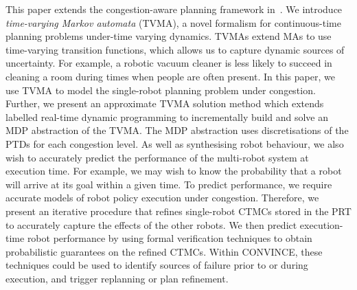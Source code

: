 \documentclass[12pt]{article}
\begin{document}
\begin{enumerate}
This paper extends the congestion-aware planning framework in~\cite{street2020multi}.
%
We introduce \emph{time-varying Markov automata} (TVMA), a novel formalism for continuous-time planning problems under-time varying dynamics.
%
TVMAs extend MAs to use time-varying transition functions, which allows us to capture dynamic sources of uncertainty.
%
For example, a robotic vacuum cleaner is less likely to succeed in cleaning a room during times when people are often present.
%
In this paper, we use TVMA to model the single-robot planning problem under congestion.
% 
Further, we present an approximate TVMA solution method which extends labelled real-time dynamic programming to incrementally build and solve an MDP abstraction of the TVMA.
%
The MDP abstraction uses discretisations of the PTDs for each congestion level.
%
As well as synthesising robot behaviour, we also wish to accurately predict the performance of the multi-robot system at execution time.
%
For example, we may wish to know the probability that a robot will arrive at its goal within a given time.
%
To predict performance, we require accurate models of robot policy
execution under congestion.
%
Therefore, we present an iterative procedure that refines single-robot CTMCs stored in the PRT to accurately capture the effects of the other robots. 
%
We then predict execution-time robot performance by using formal verification techniques to obtain probabilistic guarantees on the refined CTMCs.
%
Within CONVINCE, these techniques could be used to identify sources of failure prior to or during execution, and trigger replanning or plan refinement.

\end{enumerate}
\end{document}
